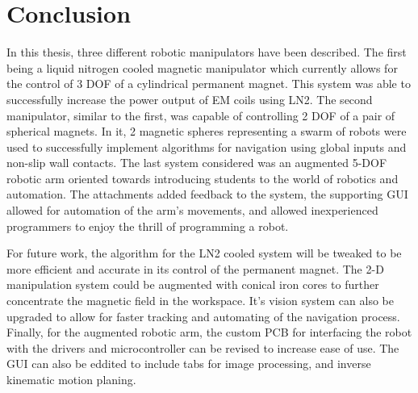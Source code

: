 
\chapter[Conclusion]{Conclusion}
\label{chap-conc}

In this thesis, three different robotic manipulators have been described. The first being a liquid nitrogen cooled magnetic manipulator which currently allows for the control of 3 DOF of a cylindrical permanent magnet. This system was able to successfully increase the power output of EM coils using LN2. The second manipulator, similar to the first, was capable of controlling 2 DOF of a pair of spherical magnets. In it, 2 magnetic spheres representing a swarm of robots were used to successfully implement algorithms  for navigation using global inputs and non-slip wall contacts. The last system considered was an augmented 5-DOF robotic arm oriented towards introducing students to the world of robotics and automation. The attachments added feedback to the system, the supporting GUI allowed for automation of the arm's movements,  and allowed inexperienced programmers to enjoy the thrill of programming a robot. 

For future work, the algorithm for the LN2 cooled system will be tweaked to be more efficient and accurate in its control of the permanent magnet. The 2-D manipulation system could be augmented with conical iron cores to further concentrate the magnetic field in the workspace. It's vision system can also be upgraded to allow for faster tracking and automating of the navigation process. Finally, for the augmented robotic arm, the custom PCB for interfacing the robot with the drivers and microcontroller can be revised to increase ease of use. The GUI can also be eddited to include tabs for image processing, and inverse kinematic motion planing. 




